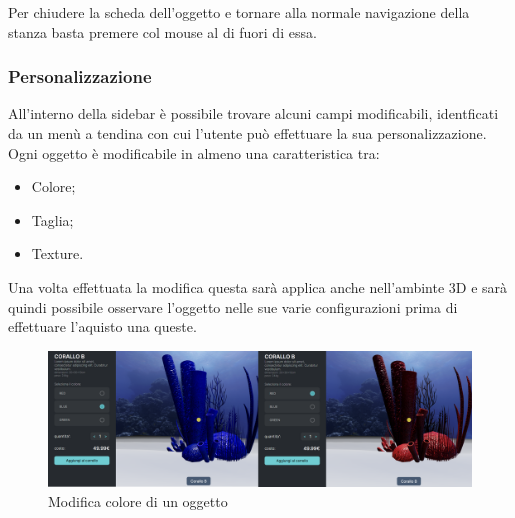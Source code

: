 Per chiudere la scheda dell'oggetto e tornare alla normale navigazione della stanza basta premere col mouse al di fuori di essa.
\subsubsection{Personalizzazione}
All'interno della sidebar è possibile trovare alcuni campi modificabili, identficati da un menù a tendina con cui l'utente può effettuare la sua personalizzazione.
Ogni oggetto è modificabile in almeno una caratteristica tra:
\begin{itemize}
	\item Colore;
	\item Taglia;
	\item Texture.
\end{itemize}
Una volta effettuata la modifica questa sarà applica anche nell'ambinte 3D e sarà quindi possibile osservare l'oggetto nelle sue varie configurazioni prima di effettuare l'aquisto una queste.
\begin{figure}[H]
  \renewcommand{\thefigure}{2}
\begin{center}
  \includegraphics[width=\linewidth]{./res/images/modifica.png}
\end{center}
  \caption{Modifica colore di un oggetto}
  \label{Modifica colore di un oggetto}
\end{figure}
\pagebreak

